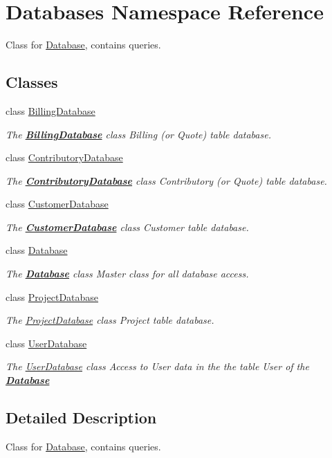 \hypertarget{namespaceDatabases}{\section{Databases Namespace Reference}
\label{namespaceDatabases}
}


Class for \hyperlink{classDatabases_1_1Database}{Database}, contains queries.  


\subsection*{Classes}
\begin{DoxyCompactItemize}
\item 
class \hyperlink{classDatabases_1_1BillingDatabase}{Billing\-Database}
\begin{DoxyCompactList}\small\item\em The {\bfseries \hyperlink{classDatabases_1_1BillingDatabase}{Billing\-Database}} class Billing (or Quote) table database. \end{DoxyCompactList}\item 
class \hyperlink{classDatabases_1_1ContributoryDatabase}{Contributory\-Database}
\begin{DoxyCompactList}\small\item\em The {\bfseries \hyperlink{classDatabases_1_1ContributoryDatabase}{Contributory\-Database}} class Contributory (or Quote) table database. \end{DoxyCompactList}\item 
class \hyperlink{classDatabases_1_1CustomerDatabase}{Customer\-Database}
\begin{DoxyCompactList}\small\item\em The {\bfseries \hyperlink{classDatabases_1_1CustomerDatabase}{Customer\-Database}} class Customer table database. \end{DoxyCompactList}\item 
class \hyperlink{classDatabases_1_1Database}{Database}
\begin{DoxyCompactList}\small\item\em The {\bfseries \hyperlink{classDatabases_1_1Database}{Database}} class Master class for all database access. \end{DoxyCompactList}\item 
class \hyperlink{classDatabases_1_1ProjectDatabase}{Project\-Database}
\begin{DoxyCompactList}\small\item\em The \hyperlink{classDatabases_1_1ProjectDatabase}{Project\-Database} class Project table database. \end{DoxyCompactList}\item 
class \hyperlink{classDatabases_1_1UserDatabase}{User\-Database}
\begin{DoxyCompactList}\small\item\em The \hyperlink{classDatabases_1_1UserDatabase}{User\-Database} class Access to User data in the the table User of the {\bfseries \hyperlink{classDatabases_1_1Database}{Database}} \end{DoxyCompactList}\end{DoxyCompactItemize}


\subsection{Detailed Description}
Class for \hyperlink{classDatabases_1_1Database}{Database}, contains queries. 